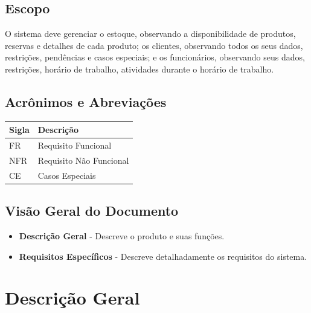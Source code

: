\documentclass{article}
\begin{document}
\subsection{Escopo}
    O sistema deve gerenciar o estoque, observando a disponibilidade de produtos, reservas e detalhes de cada produto; os clientes, observando todos os seus dados, restrições, pendências e casos especiais; e os funcionários, observando seus dados, restrições, horário de trabalho, atividades durante o horário de trabalho.
    
  \subsection{Acrônimos e Abreviações}
    \FloatBarrier
    \begin{table}[H]
      \begin{center}
        \begin{tabular}[pos]{|m{2cm} | m{12cm}|} 
          \hline
          \cellcolor[gray]{0.9}\textbf{Sigla} & \cellcolor[gray]{0.9}\textbf{Descrição} \\ \hline
          FR      & Requisito Funcional  \\ \hline
          NFR     & Requisito Não Funcional  \\ \hline
          CE      & Casos Especiais  \\ \hline
        \end{tabular}
      \end{center}
    \end{table}  
    
\subsection{Visão Geral do Documento}
  \begin{itemize}
   \item \textbf{Descrição Geral} - Descreve o produto e suas funções.
   \item \textbf{Requisitos Específicos} - Descreve detalhadamente os requisitos do sistema.
  \end{itemize}


  \section{Descrição Geral}
\end{document}
